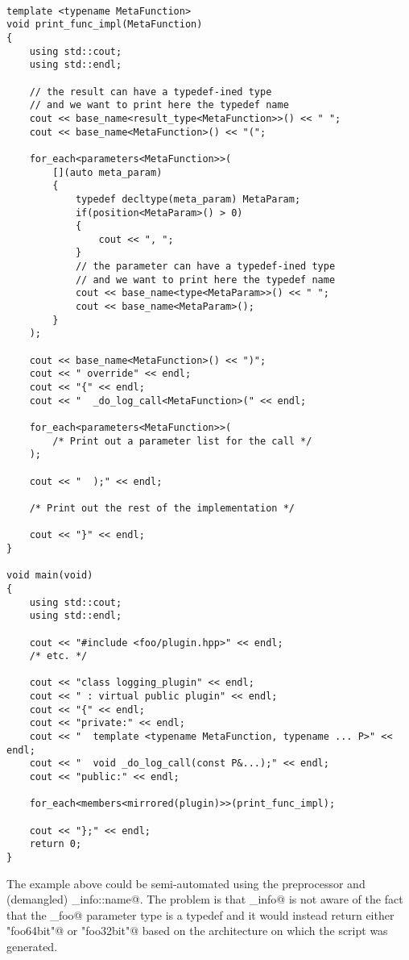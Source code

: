 \begin{verbatim}

template <typename MetaFunction>
void print_func_impl(MetaFunction)
{
	using std::cout;
	using std::endl;

	// the result can have a typedef-ined type
	// and we want to print here the typedef name
	cout << base_name<result_type<MetaFunction>>() << " ";
	cout << base_name<MetaFunction>() << "(";

	for_each<parameters<MetaFunction>>(
		[](auto meta_param)
		{
			typedef decltype(meta_param) MetaParam;
			if(position<MetaParam>() > 0)
			{
				cout << ", ";
			}
			// the parameter can have a typedef-ined type
			// and we want to print here the typedef name
			cout << base_name<type<MetaParam>>() << " ";
			cout << base_name<MetaParam>();
		}
	);

	cout << base_name<MetaFunction>() << ")";
	cout << " override" << endl;
	cout << "{" << endl;
	cout << "  _do_log_call<MetaFunction>(" << endl;

	for_each<parameters<MetaFunction>>(
		/* Print out a parameter list for the call */
	);

	cout << "  );" << endl;

	/* Print out the rest of the implementation */

	cout << "}" << endl;
}

void main(void)
{
	using std::cout;
	using std::endl;

	cout << "#include <foo/plugin.hpp>" << endl;
	/* etc. */

	cout << "class logging_plugin" << endl;
	cout << " : virtual public plugin" << endl;
	cout << "{" << endl;
	cout << "private:" << endl;
	cout << "  template <typename MetaFunction, typename ... P>" << endl;
	cout << "  void _do_log_call(const P&...);" << endl;
	cout << "public:" << endl;

	for_each<members<mirrored(plugin)>>(print_func_impl);

	cout << "};" << endl;
	return 0;
}

\end{verbatim}

The example above could be semi-automated using the preprocessor
and (demangled) \verb@type_info::name@. The problem is that
\verb@type_info@ is not aware of the fact that the \verb@default_foo@
parameter type is a typedef and it would instead return either
\verb@"foo64bit"@ or \verb@"foo32bit"@ based on the architecture
on which the script was generated.

